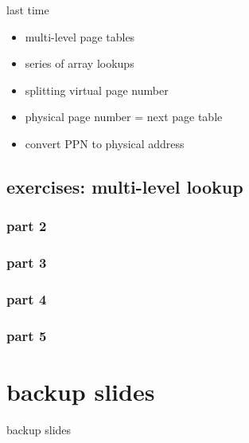 \date{}
\title{}
\date{}

\begin{frame}
    \titlepage
\end{frame}




\begin{frame}{last time}
    \begin{itemize}
    \item multi-level page tables
    \item series of array lookups
    \item splitting virtual page number
    \item physical page number = next page table
    \item convert PPN to physical address
    \end{itemize}
\end{frame}

\subsection{exercises: multi-level lookup}
\subsubsection{part 2}

\subsubsection{part 3}


\subsubsection{part 4}

\subsubsection{part 5}



\section{backup slides}
\begin{frame}{backup slides}
\end{frame}



